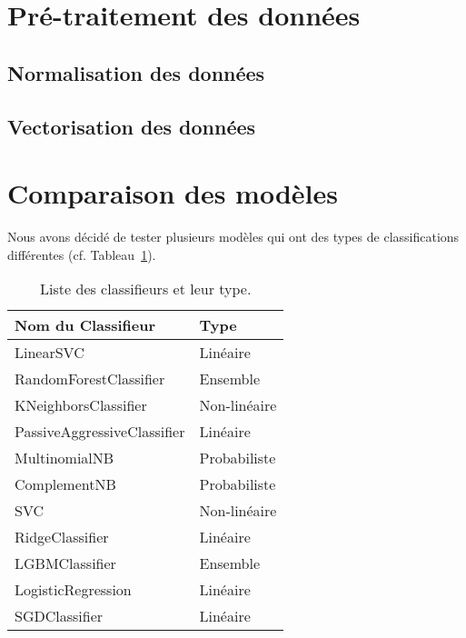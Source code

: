 \documentclass[11pt]{article}
\begin{document}
\section{Pré-traitement des données}

\subsection{Normalisation des données}

\subsection{Vectorisation des données}

\section{Comparaison des modèles}
Nous avons décidé de tester plusieurs modèles qui ont des types de classifications différentes (cf. Tableau~\ref{tab:classifieurs_types}).

\begin{table}[h]
    \centering
    \begin{tabular}{|l|l|}
        \hline
        \textbf{Nom du Classifieur}        & \textbf{Type} \\ \hline
        LinearSVC                         & Linéaire      \\ \hline
        RandomForestClassifier            & Ensemble      \\ \hline
        KNeighborsClassifier              & Non-linéaire  \\ \hline
        PassiveAggressiveClassifier       & Linéaire      \\ \hline
        MultinomialNB                     & Probabiliste  \\ \hline
        ComplementNB                      & Probabiliste  \\ \hline
        SVC                               & Non-linéaire  \\ \hline
        RidgeClassifier                   & Linéaire      \\ \hline
        LGBMClassifier                    & Ensemble      \\ \hline
        LogisticRegression                & Linéaire      \\ \hline
        SGDClassifier                     & Linéaire      \\ \hline
    \end{tabular}
    \caption{Liste des classifieurs et leur type.}
    \label{tab:classifieurs_types} %
\end{table}
\end{document}
